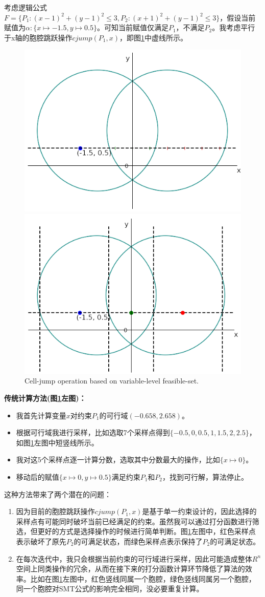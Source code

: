 \begin{example}
\label{ex:jump}
考虑逻辑公式$F = \{P_1: (x-1)^2 + (y-1)^2 \leq 3, P_2: (x+1)^2 + (y-1)^2 \leq 3\}$，假设当前赋值为$\alpha: \{x \mapsto -1.5, y \mapsto 0.5\}$。可知当前赋值仅满足$P_1$，不满足$P_2$。我考虑平行于x轴的胞腔跳跃操作$cjump(P_1, x)$，即图\ref{fig:jump2}中虚线所示。

\begin{figure}[t]
    \centering
    \includegraphics[width=0.45\columnwidth]{Img/op1.png}\qquad
    \includegraphics[width=0.45\columnwidth]{Img/op2.png}
     {Cell-jump operation based on variable-level feasible-set.}
\label{fig:jump2}
\end{figure}

\textbf{传统计算方法(图\ref{fig:jump2}左图)：}
\begin{itemize}
    \item 我首先计算变量$x$对约束$P_1$的可行域$(-0.658, 2.658)$。
    \item 根据可行域我进行采样，比如选取7个采样点得到$\{-0.5, 0, 0.5, 1, 1.5, 2, 2.5\}$，如图\ref{fig:jump2}左图中短竖线所示。
    \item 我对这5个采样点逐一计算分数，选取其中分数最大的操作，比如$\{x \mapsto 0\}$。
    \item 移动后的赋值$\{x \mapsto 0, y \mapsto 0.5\}$满足约束$P_1$和$P_2$，找到可行解，算法停止。
\end{itemize}

这种方法带来了两个潜在的问题：
\begin{enumerate}
    \item 因为目前的胞腔跳跃操作$cjump(P_1, x)$是基于单一约束设计的，因此选择的采样点有可能同时破坏当前已经满足的约束。虽然我可以通过打分函数进行筛选，但更好的方式是选择操作的时候进行简单判断。图\ref{fig:jump2}左图中，红色采样点表示破坏了原先$P_2$的可满足状态，而绿色采样点表示保持了$P_2$的可满足状态。
    \item 在每次迭代中，我只会根据当前约束的可行域进行采样，因此可能造成整体$R^n$空间上同类操作的冗余，从而在接下来的打分函数计算环节降低了算法的效率。比如在图\ref{fig:jump2}左图中，红色竖线同属一个胞腔，绿色竖线同属另一个胞腔，同一个胞腔对SMT公式的影响完全相同，没必要重复计算。
\end{enumerate}


\end{example}
